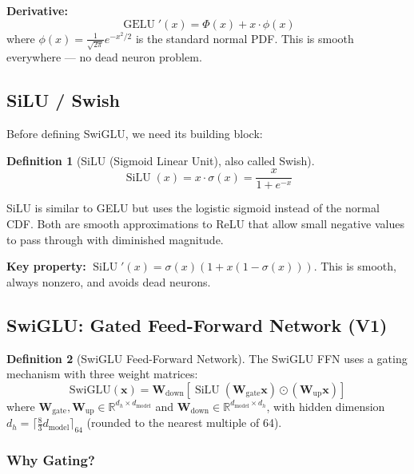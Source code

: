 \documentclass[11pt, a4paper]{article}
\theoremstyle{definition}
\newtheorem{definition}{Definition}[section]
\newcommand{\vx}{\bm{x}}
\newcommand{\mW}{\bm{W}}
\newcommand{\reals}{\mathbb{R}}
\newcommand{\dmodel}{d_{\text{model}}}
\DeclareMathOperator{\GELU}{GELU}
\DeclareMathOperator{\SiLU}{SiLU}
\begin{document}
\textbf{Derivative:}
\begin{equation}
    \GELU'(x) = \Phi(x) + x \cdot \phi(x)
\end{equation}
where $\phi(x) = \frac{1}{\sqrt{2\pi}}e^{-x^2/2}$ is the standard normal PDF. This is smooth everywhere — no dead neuron problem.

\subsection{SiLU / Swish}

Before defining SwiGLU, we need its building block:

\begin{definition}[SiLU (Sigmoid Linear Unit), also called Swish]
\begin{equation}\label{eq:silu}
    \SiLU(x) = x \cdot \sigma(x) = \frac{x}{1 + e^{-x}}
\end{equation}
\end{definition}

SiLU is similar to GELU but uses the logistic sigmoid instead of the normal CDF. Both are smooth approximations to ReLU that allow small negative values to pass through with diminished magnitude.

\textbf{Key property:} $\SiLU'(x) = \sigma(x)(1 + x(1 - \sigma(x)))$. This is smooth, always nonzero, and avoids dead neurons.

\subsection{SwiGLU: Gated Feed-Forward Network (V1)}

\begin{definition}[SwiGLU Feed-Forward Network]
The SwiGLU FFN uses a gating mechanism with three weight matrices:
\begin{equation}\label{eq:swiglu}
    \mathrm{SwiGLU}(\vx) = \mW_{\text{down}} \left[\SiLU(\mW_{\text{gate}} \vx) \odot (\mW_{\text{up}} \vx)\right]
\end{equation}
where $\mW_{\text{gate}}, \mW_{\text{up}} \in \reals^{d_h \times \dmodel}$ and $\mW_{\text{down}} \in \reals^{\dmodel \times d_h}$, with hidden dimension $d_h = \lceil \frac{8}{3}\dmodel \rceil_{64}$ (rounded to the nearest multiple of 64).
\end{definition}

\subsubsection{Why Gating?}
\end{document}
